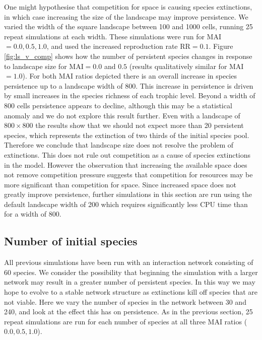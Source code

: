 One might hypothesise that competition for space is causing species extinctions, in which case increasing the size of the landscape may improve persistence. We varied the width of the square landscape between 100 and 1000 cells, running 25 repeat simulations at each width. These simulations were run for MAI$=0.0,0.5,1.0$, and used the increased reproduction rate RR$=0.1$. Figure \ref{fig:ls_v_comp} shows how the number of persistent species changes in response to landscape size for MAI$=0.0$ and $0.5$ (results qualitatively similar for MAI$=1.0$). For both MAI ratios depicted there is an overall increase in species persistence up to a landscape width of 800. This increase in persistence is driven by small increases in the species richness of each trophic level. Beyond a width of 800 cells persistence appears to decline, although this may be a statistical anomaly and we do not explore this result further. Even with a landscape of $800 \times 800$ the results show that we should not expect more than 20 persistent species, which represents the extinction of two thirds of the initial species pool. Therefore we conclude that landscape size does not resolve the problem of extinctions. This does not rule out competition as a cause of species extinctions in the model. However the observation that increasing the available space does not remove competition pressure suggests that competition for resources may be more significant than competition for space. Since increased space does not greatly improve persistence, further simulations in this section are run using the default landscape width of 200 which requires significantly less CPU time than for a width of 800.

\subsection{Number of initial species}
\label{sec:numsp_vp}

All previous simulations have been run with an interaction network consisting of 60 species. We consider the possibility that beginning the simulation with a larger network may result in a greater number of persistent species. In this way we may hope to evolve to a stable network structure as extinctions kill off species that are not viable. Here we vary the number of species in the network between 30 and 240, and look at the effect this has on persistence. As in the previous section, 25 repeat simulations are run for each number of species at all three MAI ratios ($0.0,0.5,1.0$).
 

